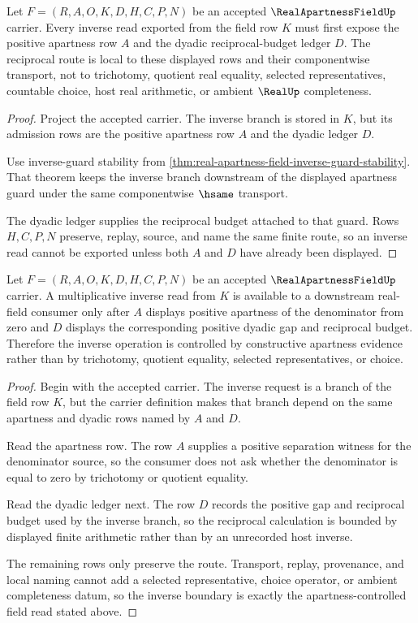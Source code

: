 \begin{theorem}
\label{thm:real-apartness-field-reciprocal-budget-locality}
Let $F=(R,A,O,K,D,H,C,P,N)$ be an accepted $\RealApartnessFieldUp$ carrier. Every inverse read exported from the field row $K$ must first expose the positive apartness row $A$ and the dyadic reciprocal-budget ledger $D$. The reciprocal route is local to these displayed rows and their componentwise transport, not to trichotomy, quotient real equality, selected representatives, countable choice, host real arithmetic, or ambient $\RealUp$ completeness.
\end{theorem}
\begin{proof}
Project the accepted carrier. The inverse branch is stored in $K$, but its admission rows are the positive apartness row $A$ and the dyadic ledger $D$.

Use inverse-guard stability from \autoref{thm:real-apartness-field-inverse-guard-stability}. That theorem keeps the inverse branch downstream of the displayed apartness guard under the same componentwise $\hsame$ transport.

The dyadic ledger supplies the reciprocal budget attached to that guard. Rows $H,C,P,N$ preserve, replay, source, and name the same finite route, so an inverse read cannot be exported unless both $A$ and $D$ have already been displayed.
\end{proof}

\begin{theorem}
\label{thm:real-apartness-field-apartness-multiplicative-inverse}
Let $F=(R,A,O,K,D,H,C,P,N)$ be an accepted $\RealApartnessFieldUp$ carrier. A multiplicative inverse read from $K$ is available to a downstream real-field consumer only after $A$ displays positive apartness of the denominator from zero and $D$ displays the corresponding positive dyadic gap and reciprocal budget. Therefore the inverse operation is controlled by constructive apartness evidence rather than by trichotomy, quotient equality, selected representatives, or choice.
\end{theorem}
\begin{proof}
Begin with the accepted carrier. The inverse request is a branch of the field row $K$, but the carrier definition makes that branch depend on the same apartness and dyadic rows named by $A$ and $D$.

Read the apartness row. The row $A$ supplies a positive separation witness for the denominator source, so the consumer does not ask whether the denominator is equal to zero by trichotomy or quotient equality.

Read the dyadic ledger next. The row $D$ records the positive gap and reciprocal budget used by the inverse branch, so the reciprocal calculation is bounded by displayed finite arithmetic rather than by an unrecorded host inverse.

The remaining rows only preserve the route. Transport, replay, provenance, and local naming cannot add a selected representative, choice operator, or ambient completeness datum, so the inverse boundary is exactly the apartness-controlled field read stated above.
\end{proof}

